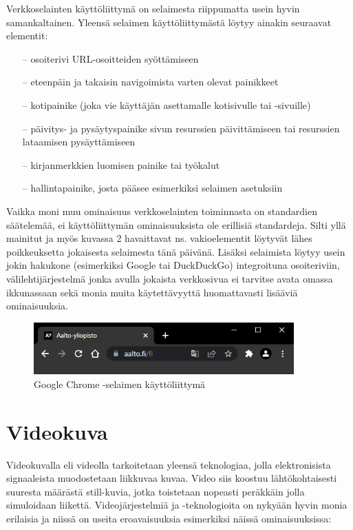 \documentclass[finnish, 12pt, a4paper, elec, utf8, a-1b, online]{aaltothesis}
\begin{document}
\noindent Verkkoselainten käyttöliittymä on selaimesta riippumatta usein hyvin samankaltainen. Yleensä selaimen käyttöliittymästä löytyy ainakin seuraavat elementit:
\begin{itemize}
  \item[--] osoiterivi URL-osoitteiden syöttämiseen
  \item[--] eteenpäin ja takaisin navigoimista varten olevat painikkeet
  \item[--] kotipainike (joka vie käyttäjän asettamalle kotisivulle tai -sivuille)
  \item[--] päivitys- ja pysäytyspainike sivun resurssien päivittämiseen tai resurssien lataamisen pysäyttämiseen
  \item[--] kirjanmerkkien luomisen painike tai työkalut
  \item[--] hallintapainike, josta pääsee esimerkiksi selaimen asetuksiin
\end{itemize}
Vaikka moni muu ominaisuus verkkoselainten toiminnasta on standardien säätelemää, ei käyttöliittymän ominaisuuksista ole erillisiä standardeja. Silti yllä mainitut ja myös kuvassa 2 havaittavat ns. vakioelementit löytyvät lähes poikkeuksetta jokaisesta selaimesta tänä päivänä. Lisäksi selaimista löytyy usein jokin hakukone (esimerkiksi Google tai DuckDuckGo) integroituna osoiteriviin, välilehtijärjestelmä jonka avulla jokaista verkkosivua ei tarvitse avata omassa ikkunassaan sekä monia muita käytettävyyttä huomattavasti lisääviä ominaisuuksia.

\begin{figure}[htb]
  \centering
  \includegraphics[height=2cm]{./img/browser-ui.png}
  \caption{Google Chrome -selaimen käyttöliittymä \label{kuva2}}
\end{figure}

\clearpage

\section{Videokuva}

Videokuvalla eli videolla tarkoitetaan yleensä teknologiaa, jolla elektronisista signaaleista muodostetaan liikkuvaa kuvaa. Video siis koostuu lähtökohtaisesti suuresta määrästä still-kuvia, jotka toistetaan nopeasti peräkkäin jolla simuloidaan liikettä. Videojärjestelmiä ja -teknologioita on nykyään hyvin monia erilaisia ja niissä on useita eroavaisuuksia esimerkiksi näissä ominaisuuksissa:
\end{document}
